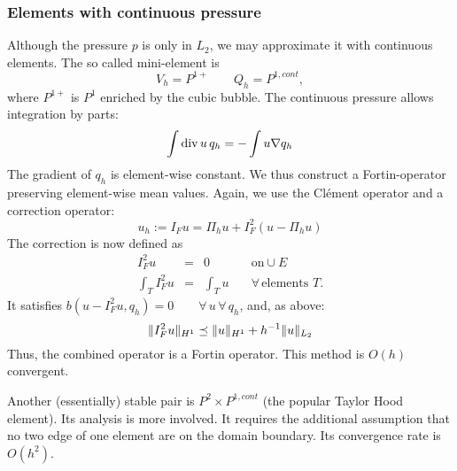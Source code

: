 \subsubsection{Elements with continuous pressure}
Although the pressure $p$ is only in $L_2$, we may approximate it with
continuous elements. The so called mini-element is
$$
V_h = P^{1+} \qquad Q_h = P^{1,cont},
$$
where $P^{1+}$ is $P^1$ enriched by the cubic bubble. The continuous
pressure allows integration by parts:
$$
\int \operatorname{div} u \, q_h = - \int u \nabla q_h
$$
The gradient of $q_h$ is element-wise constant. We thus construct a
Fortin-operator
preserving element-wise mean values. Again, we use the Cl\'ement operator
and a  correction operator:
$$
u_h := I_F u = \Pi_h u + I_F^2 (u - \Pi_h u)
$$
The correction is now defined as
$$
\begin{array}{rcll}
I_F^2 u & = & 0  \quad & \text{on} \cup E  \\
\int_T I_F^2 u & = & \int_T u \quad & \forall \, \text{elements } T.
\end{array}
$$
It satisfies $b(u - I_F^2 u, q_h) = 0 \qquad \forall \, u \, \forall
\, q_h$, and, as above:
$$
\| I_F^2 u \|_{H^1} \preceq \| u \|_{H^1} + h^{-1} \| u \|_{L_2}
$$
Thus, the combined operator is a Fortin operator.
This method is $O(h)$ convergent.
\medskip

Another (essentially) stable pair is $P^2 \times P^{1,cont}$ (the
popular Taylor Hood element). Its analysis is more involved. 
It requires the additional assumption that no two edge of one element are
on the domain boundary. Its convergence rate is $O(h^2)$.
% 